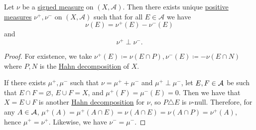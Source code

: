 \begin{theorem}\label{thm:Jordan-decomposition-theorem}
  Let \(\nu\) be a \hyperref[def:signed-measure]{signed measure} on \((X, \mathcal{A})\). Then there exists unique \hyperref[def:measure]{positive measures} \(\nu^+,\nu^-\)
  on \((X, \mathcal{A})\) such that for all \(E \in \mathcal{A}\) we have
  \[
    \nu(E) = \nu^+(E) - \nu^-(E)
  \]
  and
  \[
    \nu^+ \perp \nu^-.
  \]
\end{theorem}
\begin{proof}
  For existence, we take \(\nu^+(E) \coloneqq \nu(E \cap P), \nu^-(E) \coloneqq -\nu(E \cap N)\) where \(P, N\) is the
  \hyperref[thm:Hahn-decomposition-theorem]{Hahn decomposition} of \(X\).

  If there exists \(\mu ^+, \mu ^-\) such that \(\nu = \mu ^+ + \mu ^-\) and \(\mu ^+ \perp \mu ^-\), let \(E, F\in \mathcal{\MakeUppercase{a}} \) be
  such that \(E\cap F = \varnothing \), \(E\cup F= X\), and \(\mu ^+(F) = \mu ^-(E) = 0\). Then we have that \(X = E \cup F\) is another
  \hyperref[thm:Hahn-decomposition-theorem]{Hahn decomposition} for \(\nu \), so \(P\triangle E\) is \(\nu\)-null. Therefore, for any
  \(A \in \mathcal{\MakeUppercase{a}} \), \(\mu ^+(A) = \mu ^+(A \cap E) = \nu (A \cap E) = \nu (A \cap P) = \nu ^+(A)\), hence \(\mu ^+ = \nu ^+\).
  Likewise, we have \(\nu ^- = \mu ^-\).
\end{proof}